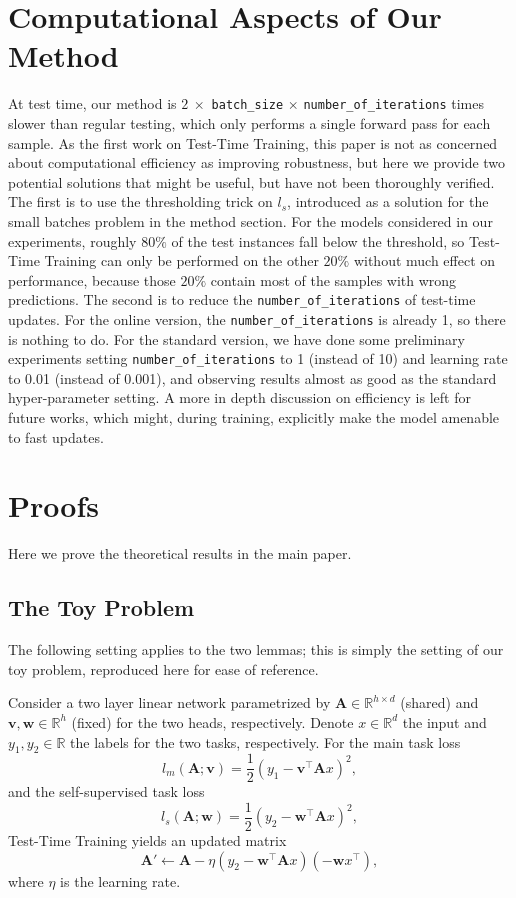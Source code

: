 \documentclass{article}
\theoremstyle{plain}
\theoremstyle{remark}
\theoremstyle{definition}
\def\vv{{\bm{v}}}
\def\vw{{\bm{w}}}
\def\mA{{\bm{A}}}
\newcommand{\R}{\mathbb{R}}
\begin{document}
\section{Computational Aspects of Our Method}
\label{computational}
At test time, our method is $2~\times$
\texttt{batch\_size}
$\times$
\texttt{number\_of\_iterations} 
times slower than regular testing, 
which only performs a single forward pass for each sample. 
As the first work on Test-Time Training, this paper is not as concerned about computational efficiency as improving robustness, but here we provide two potential solutions that might be useful, but have not been thoroughly verified.
The first is to use the thresholding trick on $l_s$, introduced as a solution for the small batches problem in the method section. For the models considered in our experiments, roughly $80\%$ of the test instances fall below the threshold, so Test-Time Training can only be performed on the other $20\%$ without much effect on performance, because those $20\%$ contain most of the samples with wrong predictions.
The second is to reduce the \texttt{number\_of\_iterations} of test-time updates. For the online version, the \texttt{number\_of\_iterations} is already 1, so there is nothing to do. For the standard version, we have done some preliminary experiments setting \texttt{number\_of\_iterations} to 1 (instead of 10) and learning rate to 0.01 (instead of 0.001), and observing results almost as good as the standard hyper-parameter setting.
A more in depth discussion on efficiency is left for future works, which might, during training, explicitly make the model amenable to fast updates.

\section{Proofs}
Here we prove the theoretical results in the main paper.
\subsection{The Toy Problem}
The following setting applies to the two lemmas; this is simply the setting of our toy problem, reproduced here for ease of reference.

\pagebreak
Consider a two layer linear network parametrized by $\mA\in\R^{h\times d}$ (shared) and $\vv, \vw\in\R^h$ (fixed) for the two heads, respectively.
Denote $x\in\R^d$ the input and $y_1, y_2\in\R$ the labels for the two tasks, respectively.
For the main task loss
\begin{equation}
l_m(\mA; \vv) = \frac{1}{2}\left(y_1 - \vv^\top \mA x\right)^2,
\end{equation}
and the self-supervised task loss
\begin{equation}
l_s(\mA; \vw) = \frac{1}{2}\left(y_2 - \vw^\top \mA x\right)^2,
\end{equation}
Test-Time Training yields an updated matrix
\begin{equation}
\mA' \leftarrow \mA - \eta\left( y_2-\vw^\top \mA x \right) \left(-\vw x^\top \right),
\end{equation}
where $\eta$ is the learning rate.
\end{document}
